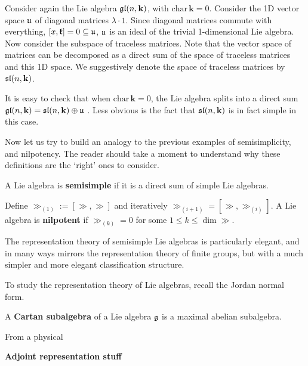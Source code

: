 		\begin{eg}
			Consider again the Lie algebra $\frak{gl}(n, \mathbf k)$, with $\mathrm{char}\, \mathbf k = 0$. Consider the 1D vector space $\frak u$ of diagonal matrices $\lambda \cdot 1$. Since diagonal matrices commute with everything, $[x, \frak k] = 0 \subseteq \frak u$, $\frak u$ is an ideal of the trivial 1-dimensional Lie algebra. Now consider the subspace of traceless matrices. Note that the vector space of matrices can be decomposed as a direct sum of the space of traceless matrices and this 1D space. We suggestively denote the space of traceless matrices by $\frak{sl}(n, \mathbf k)$.
			
			It is easy to check that when $\mathrm{char}\, \mathbf k = 0$, the Lie algebra splits into a direct sum $\frak{gl}(n, \mathbf k) = \frak{sl}(n, \mathbf k) \oplus \frak u$ . Less obvious is the fact that $\frak{sl}(n, \mathbf k)$ is in fact simple in this case.
		\end{eg}
		
		Now let us try to build an analogy to the previous examples of semisimplicity, and nilpotency. The reader should take a moment to understand why these definitions are the `right' ones to consider.
		
		\begin{defn}
			A Lie algebra is \textbf{semisimple} if it is a direct sum of simple Lie algebras.
		\end{defn}
		
		\begin{defn}
			Define $\gg_{(1)} := [\gg, \gg]$ and iteratively $\gg_{(i+1)} = [\gg, \gg_{(i)}]$.
			A Lie algebra is \textbf{nilpotent} if $\gg_{(k)} = 0$ for some $1 \leq k \leq \dim \gg$.
		\end{defn}
		
		The representation theory of semisimple Lie algebras is particularly elegant, and in many ways mirrors the representation theory of finite groups, but with a much simpler and more elegant classification structure. 
		
		To study the representation theory of Lie algebras, recall the Jordan normal form. 
		
		\begin{defn}
			A \textbf{Cartan subalgebra} of a Lie algebra $\frak g$ is a maximal abelian subalgebra.
		\end{defn}
		From a physical 
		
		\textbf{Adjoint representation stuff}
		
